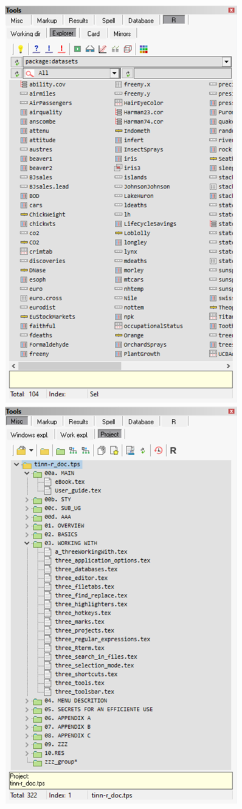 \includegraphics[scale=0.60]{./res/tools_r_explorer.png}
\includegraphics[scale=0.60]{./res/tools_misc_project.png}

